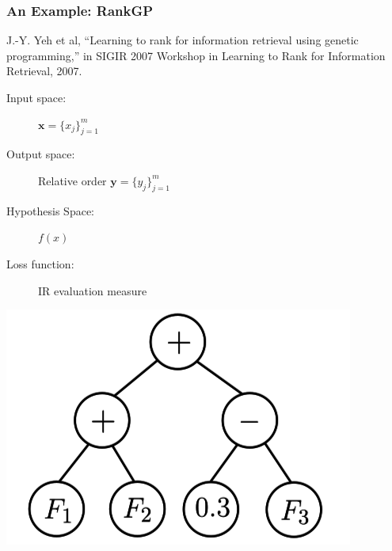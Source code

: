 \documentclass{beamer}
\begin{document}
\begin{frame}
    \frametitle{An Example: RankGP}
    \begin{minipage}{1.0\linewidth}
        \footnotesize J.-Y. Yeh et al, ``Learning to rank for information
        retrieval using genetic programming,'' in SIGIR 2007 Workshop in
        Learning to Rank for Information Retrieval, 2007.
    \end{minipage}
    \vfill
    \begin{description}
    \item[Input space:] $\mathbf{x} = \{x_j\}_{j=1}^m$
    \item[Output space:] Relative order $\mathbf{y} = \{y_j\}_{j=1}^m$
    \item[Hypothesis Space:] $f(x)$ 
    \item[Loss function:] IR evaluation measure
    \end{description}
    \begin{center}
        \includegraphics[scale=.3]{gprank}
    \end{center}
\end{frame}


\end{document}

